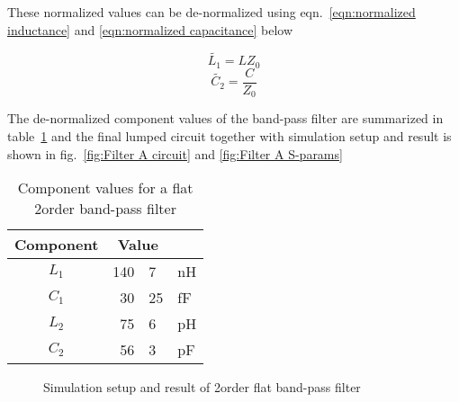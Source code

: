 \documentclass[report.tex]{subfiles}
\begin{document}
These normalized values can be de-normalized using eqn.~\ref{eqn:normalized inductance} and \ref{eqn:normalized capacitance} below

\begin{equation}
    \label{eqn:normalized inductance}
    \tilde{L_1}=L Z_0
\end{equation}
\begin{equation}
    \label{eqn:normalized capacitance}
    \tilde{C_2}=\frac{C}{Z_0}
\end{equation}

The de-normalized component values of the band-pass filter are summarized in table~\ref{table:filter values} and the final lumped circuit together with simulation setup and result is shown in fig.~\ref{fig:Filter A circuit} and \ref{fig:Filter A S-params}

\begin{table}[h]
    \centering
    \caption{Component values for a flat 2\nd order band-pass filter}
    \begin{tabular}{c | r @{.} l @{} l}
        Component & \multicolumn{2}{c}{Value} \\
        \hline
        $L_1$     & 140&7 & nH\\
        $C_1$     & 30&25 & fF\\
        $L_2$     & 75&6  & pH\\
        $C_2$     & 56&3  & pF\\
    \end{tabular}
    \label{table:filter values}
\end{table}

\clearpage
\begin{figure}[h]
    \centering
    
    \caption{Simulation setup and result of 2\nd order flat band-pass filter}
\end{figure}
\clearpage
\end{document}
